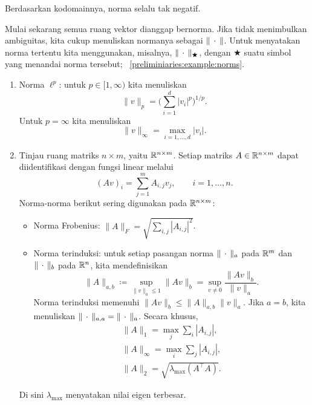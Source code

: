 \begin{rem}
    Berdasarkan kodomainnya, norma selalu tak negatif.
\end{rem}

Mulai sekarang semua ruang vektor dianggap bernorma. Jika tidak menimbulkan
ambiguitas, kita cukup menuliskan normanya sebagai $\|\,\cdot\,\|$. Untuk
menyatakan norma tertentu kita menggunakan, misalnya,
$\|\,\cdot\,\|_\bigstar$, dengan $\bigstar$ suatu simbol yang menandai norma
tersebut; \cf~\cref{preliminiaries:example:norms}.

\begin{example}
    \label{preliminiaries:example:norms}
    \begin{enumerate}
        \item Norma $\ell^p$: untuk $p\in[1,\infty)$ kita menuliskan
        \begin{equation}
            \|v\|_p=\bigg(\sum_{i=1}^d|v_i|^p\bigg)^{1/p}.
        \end{equation}
        Untuk $p=\infty$ kita menuliskan
        \begin{equation}
            \|v\|_\infty=\max_{i=1,\dots,d}|v_i|.
        \end{equation}

        \item Tinjau ruang matriks $n\times m$, yaitu $\mathbb{R}^{n\times m}$. Setiap
        matriks $A\in\mathbb{R}^{n\times m}$ dapat diidentifikasi dengan fungsi linear
        melalui
        \begin{equation}
            (Av)_i=\sum_{j=1}^m A_{i,j}v_j,\qquad i=1,\dots,n.
        \end{equation}
        Norma-norma berikut sering digunakan pada $\mathbb{R}^{n\times m}$:
        \begin{itemize}
            \item Norma Frobenius:
            $\|A\|_F=\sqrt{\sum_{i,j}|A_{i,j}|^2}$.
            \item Norma terinduksi: untuk setiap pasangan norma
            $\|\,\cdot\,\|_a$ pada $\mathbb{R}^m$ dan $\|\,\cdot\,\|_b$ pada $\mathbb{R}^n$,
            kita mendefinisikan
            \begin{equation}
                \|A\|_{a,b}
                \coloneq\sup_{\|v\|_a\leq1}\|Av\|_b
                =\sup_{v\neq0}\frac{\|Av\|_b}{\|v\|_a}.
            \end{equation}
            Norma terinduksi memenuhi
            $\|Av\|_b\leq\|A\|_{a,b}\|v\|_a$. Jika $a=b$, kita menuliskan
            $\|\,\cdot\,\|_{a,a}=\|\,\cdot\,\|_a$. Secara khusus,
            \begin{gather}
                \|A\|_1=\max_j\sum_i|A_{i,j}|,\\
                \|A\|_\infty=\max_i\sum_j|A_{i,j}|,\\
                \|A\|_2=\sqrt{\lambda_{\mathrm{max}}(A^\top A)}.
            \end{gather}
        \end{itemize}
        Di sini $\lambda_{\mathrm{max}}$ menyatakan nilai eigen terbesar.


\end{enumerate}
\end{example}
